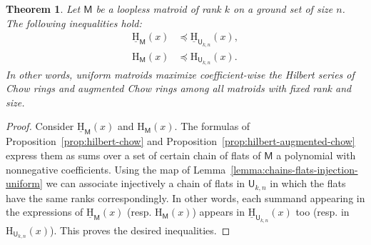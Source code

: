 \documentclass[11pt, a4paper, english]{amsart}
\theoremstyle{teoremas}
\newtheorem{theorem}{Theorem}[section]
\theoremstyle{definition}
\newcommand{\M}{\mathsf{M}}
\newcommand{\U}{\mathsf{U}}
\renewcommand{\H}{\mathrm{H}}
\newcommand{\uH}{\underline{\mathrm{H}}}
\begin{document}
\begin{theorem}\label{thm:uniform-dominates}
    Let $\M$ be a loopless matroid of rank $k$ on a ground set of size $n$. The following inequalities hold:
    \begin{align*}
        \uH_{\M}(x) &\preceq \uH_{\U_{k,n}}(x),\\
        \H_{\M}(x) &\preceq \H_{\U_{k,n}}(x).
    \end{align*}
    In other words, uniform matroids maximize coefficient-wise the Hilbert series of Chow rings and augmented Chow rings among all matroids with fixed rank and size.
\end{theorem}
 
\begin{proof}
    Consider $\uH_{\M}(x)$ and $\H_{\M}(x)$. The formulas of Proposition~\ref{prop:hilbert-chow} and Proposition~\ref{prop:hilbert-augmented-chow} express them as sums over a set of certain chain of flats of $\M$ a polynomial with nonnegative coefficients. Using the map of Lemma~\ref{lemma:chains-flats-injection-uniform} we can associate injectively a chain of flats in $\U_{k,n}$ in which the flats have the same ranks correspondingly. In other words, each summand appearing in the expressions of $\uH_{\M}(x)$ (resp. $\H_{\M}(x)$) appears in $\uH_{\U_{k,n}}(x)$ too (resp. in $\H_{\U_{k,n}}(x)$). This proves the desired inequalities.   
\end{proof}
\end{document}
